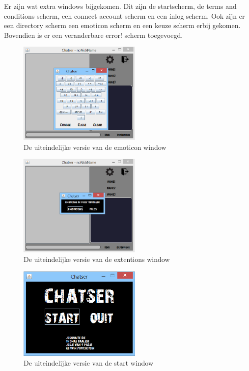 \documentclass[12pt]{article}
\begin{document}
\noindent Er zijn wat extra windows bijgekomen. Dit zijn de startscherm, de terms and conditions scherm,  een connect account scherm en een inlog scherm. Ook zijn er een directory scherm een emoticon scherm en een keuze scherm erbij gekomen. Bovendien is er een veranderbare error! scherm toegevoegd.
\begin{figure}[ht]
\begin{center}
\includegraphics[width = 60mm]{chatser_emoticons}
\caption{De uiteindelijke versie van de emoticon window}
\label{figure013}
\end{center}
\end{figure}

\begin{figure}[ht]
\begin{center}
\includegraphics[width = 60mm]{chatser_extentions}
\caption{De uiteindelijke versie van de extentions window}
\label{figure014}
\end{center}
\end{figure}

\begin{figure}[ht]
\begin{center}
\includegraphics[width = 60mm]{StartGUI}
\caption{De uiteindelijke versie van de start window}
\label{figure015}
\end{center}
\end{figure}
\end{document}
